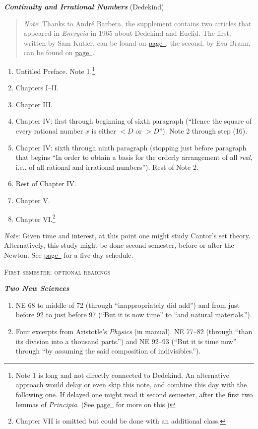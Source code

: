\documentclass[10pt]{article}
\begin{document}
\textbf{\emph{Continuity and Irrational Numbers}}
(Dedekind)
\begin{quote}
\small{\emph{Note}: Thanks to Andr\'e Barbera, the supplement contains two articles that appeared in \emph{Energeia} in 1965 about Dedekind and Euclid. The first, written by Sam Kutler, can be found on \hyperref[supple.100]{page~\pageref{supple.100}}; the second, by Eva Brann, can be found on \hyperref[supple.102]{page~\pageref{supple.102}}.}
\end{quote}
\begin{enumerate}[resume*]
	\item Untitled Preface. Note 1.\footnote{Note 1 is
			long and not directly connected to
		       Dedekind. An alternative approach
	       would delay or even skip this note, and
	       combine this day with the following one. If
       delayed one might read it second semester, after the
first two lemmas of \emph{Principia}. (See
\hyperref[Dedekind]{page~\pageref{Dedekind}} for more on
	this.)}	       
	\item Chapters I--II.
	\item Chapter III. 
	\item Chapter IV: first through beginning of sixth
		paragraph (``Hence the square of every
		rational number $x$ is either $<D$ or
		$>D$''). Note 2 through step (16).
	\item Chapter IV: sixth through ninth paragraph
		(stopping just before paragraph that begins
		``In order to obtain a basis for the orderly
		arrangement of all \emph{real}, i.e., of all
		rational and irrational numbers''). Rest of
	       Note 2.	
       \item Rest of Chapter IV.
       \item Chapter V.
       \item Chapter VI.\footnote{Chapter VII is omitted but
		       could be done with an additional
		       class.}
\end{enumerate}
{\small \emph{Note}: Given time and interest, at this point one
might study Cantor's set theory. Alternatively, this study
might be done second semester, before or after the Newton.
See \hyperref[Cantor]{page~\pageref{Cantor}} for a five-day 
schedule.}
\bigskip
\begin{center}
	\textsc{\small{First semester: optional readings}}
\end{center}
\textbf{\emph{Two New Sciences}} \label{Galileo}
\begin{enumerate}[noitemsep]
	\item NE 68 to
	middle of 72 (through ``inappropriately
	did add'') and from just before 92 to just before 97
	(``But it is now time'' to ``and
	natural materials.''). 
\item Four excerpts from
	Aristotle’s \emph{Physics} (in manual). NE 77--82 (through
	``than its division into a thousand parts.'')
	and NE 92--93 (``But it is time now'' through
	``by assuming the said composition of
	indivisibles.''). 
\end{enumerate}
\end{document}
